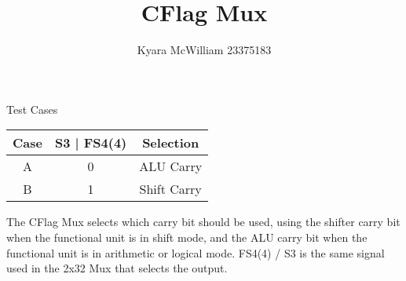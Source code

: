 \documentclass{article}
\title{CFlag Mux}
\author{Kyara McWilliam 23375183}
\date{}
\begin{document}
\maketitle

Test Cases
\hfill \break

\begin{tabular}{ |c|c|c| }
\hline
Case & S3 | FS4(4) & Selection \\
\hline
A & 0 & ALU Carry \\
B & 1 & Shift Carry \\
\hline
\end{tabular}
\hfill \break \break
The CFlag Mux selects which carry bit should be used, using the shifter carry bit when the functional unit is in shift mode, and the ALU carry bit when the functional unit is in arithmetic or logical mode. FS4(4) / S3 is the same signal used in the 2x32 Mux that selects the output.
\end{document}
